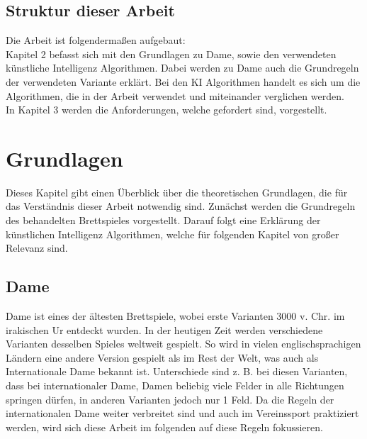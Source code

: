 \documentclass[12pt,a4paper,bibliography=totocnumbered,listof=totocnumbered]{article}
\begin{document}
\subsection{Struktur dieser Arbeit}
Die Arbeit ist folgendermaßen aufgebaut: \\
Kapitel 2 befasst sich mit den Grundlagen zu Dame, sowie den verwendeten 
künstliche Intelligenz Algorithmen. Dabei werden zu Dame auch die Grundregeln der
verwendeten Variante erklärt. Bei den KI Algorithmen handelt es sich um die Algorithmen, die in 
der Arbeit verwendet und miteinander verglichen werden. \\
In Kapitel 3 werden die Anforderungen, welche gefordert sind, vorgestellt.

\pagebreak
\section{Grundlagen}
\label{chap:Grundlagen}
Dieses Kapitel gibt einen Überblick über die theoretischen Grundlagen, die für das Verständnis 
dieser Arbeit notwendig sind. Zunächst werden die Grundregeln des behandelten Brettspieles 
vorgestellt. Darauf folgt eine Erklärung der künstlichen Intelligenz Algorithmen, welche für 
folgenden Kapitel von großer Relevanz sind. \cite{KuenstlicheIntelligenzNorvig}

\subsection{Dame}
Dame ist eines der ältesten Brettspiele, wobei erste Varianten 3000 v. Chr. im irakischen Ur
entdeckt wurden. In der heutigen Zeit werden verschiedene Varianten desselben Spieles weltweit
gespielt. So wird in vielen englischsprachigen Ländern eine andere Version gespielt als im Rest
der Welt, was auch als Internationale Dame bekannt ist. Unterschiede sind z. B. bei diesen Varianten,
dass bei internationaler Dame, Damen beliebig viele Felder in alle Richtungen springen dürfen, 
in anderen Varianten jedoch nur 1 Feld. Da die Regeln der internationalen Dame
weiter verbreitet sind und auch im Vereinssport praktiziert werden, wird sich diese Arbeit im folgenden
auf diese Regeln fokussieren. \cite{DraughtsHistory}
\end{document}
